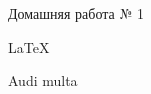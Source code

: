 \documentclass[12pt]{article}
\title{}
\author{}
\date{}
\begin{document}
	\maketitle
	\begin{center}
Домашняя работа № 1 \par
LaTeX
        \end{center}
\hfill Audi multa
\end{document}
